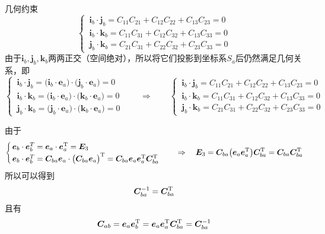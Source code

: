 \noa[2] 几何约束
\begin{equation}
	\begin{cases}
		\,\bm{i}_b \cdot \bm{j}_b = C_{11}C_{21} + C_{12}C_{22} + C_{13}C_{23} = 0 \\
		\,\bm{i}_b \cdot \bm{k}_b = C_{11}C_{31} + C_{12}C_{32} + C_{13}C_{33} = 0 \\
		\,\bm{j}_b \cdot \bm{k}_b = C_{21}C_{31} + C_{22}C_{32} + C_{23}C_{33} = 0
	\end{cases}
\end{equation}
\proof 由于$\bm{i}_b, \bm{j}_b, \bm{k}_b$两两正交（空间绝对），所以将它们投影到坐标系$S_a$后仍然满足几何关系，即
\begin{equation*}
	\begin{cases}
		\,\bm{i}_b \cdot \bm{j}_b = \big(\bm{i}_b \cdot \bm{e}_a\big) \cdot  \big(\bm{j}_b \cdot \bm{e}_a\big) = 0\\
		\,\bm{i}_b \cdot \bm{k}_b = \big(\bm{i}_b \cdot \bm{e}_a\big) \cdot \big(\bm{k}_b \cdot \bm{e}_a\big) = 0\\
		\,\bm{j}_b \cdot \bm{k}_b =\big(\bm{j}_b \cdot \bm{e}_a\big) \cdot \big(\bm{k}_b \cdot \bm{e}_a\big) = 0
	\end{cases}
	\qquad \Longrightarrow \qquad 
	\begin{cases}
		\,\bm{i}_b \cdot \bm{j}_b = C_{11}C_{21} + C_{12}C_{22} + C_{13}C_{23} = 0 \\
		\,\bm{i}_b \cdot \bm{k}_b = C_{11}C_{31} + C_{12}C_{32} + C_{13}C_{33} = 0 \\
		\,\bm{j}_b \cdot \bm{k}_b = C_{21}C_{31} + C_{22}C_{32} + C_{23}C_{33} = 0
	\end{cases}
\end{equation*}


\sssection[坐标变换矩阵是正交矩阵]

由于
\begin{equation*}
	\begin{cases}
		\,\bm{e}_b \cdot \bm{e}_b^T = \bm{e}_a \cdot \bm{e}_a^{\text{T}} = \bm{E}_3\\
		\,\bm{e}_b  \cdot \bm{e}_b^T = \bm{C}_{ba}\bm{e}_a \cdot \big( \bm{C}_{ba} \bm{e}_a \big)^{\text{T}} =  \bm{C}_{ba}\bm{e}_a  \bm{e}_a^{\text{T}} \bm{C}_{ba}^{\text{T}}
	\end{cases}
	\quad \Rightarrow \quad \bm{E}_3 = \bm{C}_{ba} \big( \bm{e}_a \bm{e}_a^{\text{T}} \big) \bm{C}_{ba}^{\text{T}} =  \bm{C}_{ba} \bm{C}_{ba}^{\text{T}}
\end{equation*}
所以可以得到
\begin{equation}
	\bm{C}_{ba}^{-1} = \bm{C}_{ba}^{\text{T}}
\end{equation}
且有
\begin{equation}
	\bm{C}_{ab} = \bm{e}_a \bm{e}_b^{\text{T}} = \bm{e}_a \bm{e}_a^{\text{T}} \bm{C}_{ba}^{\text{T}} = \bm{C}_{ba}^{-1}
\end{equation}


